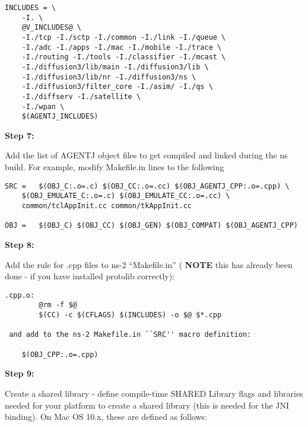 \footnotesize
\begin{verbatim}
INCLUDES = \
	-I. \
	@V_INCLUDES@ \
	-I./tcp -I./sctp -I./common -I./link -I./queue \
	-I./adc -I./apps -I./mac -I./mobile -I./trace \
	-I./routing -I./tools -I./classifier -I./mcast \
	-I./diffusion3/lib/main -I./diffusion3/lib \
	-I./diffusion3/lib/nr -I./diffusion3/ns \
	-I./diffusion3/filter_core -I./asim/ -I./qs \
	-I./diffserv -I./satellite \
	-I./wpan \
	$(AGENTJ_INCLUDES)
\end{verbatim}
\normalsize
        

\vspace{0.1in}

\noindent \textbf{Step 7:}

Add the list of AGENTJ object files to get compiled and linked during the ns build.  For example, modify Makefile.in lines to the following

\footnotesize
\begin{verbatim}
SRC =	$(OBJ_C:.o=.c) $(OBJ_CC:.o=.cc) $(OBJ_AGENTJ_CPP:.o=.cpp) \
	$(OBJ_EMULATE_C:.o=.c) $(OBJ_EMULATE_CC:.o=.cc) \
	common/tclAppInit.cc common/tkAppInit.cc 

OBJ =	$(OBJ_C) $(OBJ_CC) $(OBJ_GEN) $(OBJ_COMPAT) $(OBJ_AGENTJ_CPP)
\end{verbatim}
\normalsize

\vspace{0.1in}

\noindent \textbf{Step 8:}

Add the rule for .cpp files to ns-2 ``Makefile.in'' ( \textbf{NOTE} this has already been done - if you have installed  protolib correctly):

\footnotesize
\begin{verbatim}
.cpp.o:
	    @rm -f $@
	    $(CC) -c $(CFLAGS) $(INCLUDES) -o $@ $*.cpp
        
 and add to the ns-2 Makefile.in ``SRC'' macro definition:
    
    $(OBJ_CPP:.o=.cpp)
\end{verbatim}
\normalsize

\vspace{0.1in}

\noindent \textbf{Step 9:}


Create a shared library - define compile-time SHARED 
Library flags and  libraries needed for your platform to 
create a shared library (this is needed for the JNI binding). 
On Mac OS 10.x, these are defined as follows:

